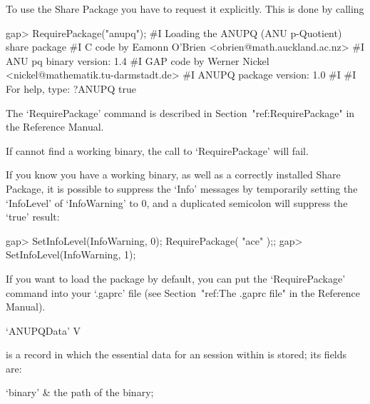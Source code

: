 


To use the {\ANUPQ} Share Package you have to request it explicitly. This
is done by calling

\beginexample
gap> RequirePackage("anupq");
#I    Loading the ANUPQ (ANU p-Quotient) share package
#I    C code by  Eamonn O'Brien <obrien@math.auckland.ac.nz>
#I                ANU pq binary version: 1.4
#I    GAP code by Werner Nickel <nickel@mathematik.tu-darmstadt.de>
#I                ANUPQ package version: 1.0
#I  
#I                For help, type: ?ANUPQ
true
\endexample

The `RequirePackage' command is described in Section~"ref:RequirePackage"
in the {\GAP} Reference Manual.

If {\GAP} cannot find a working binary, the call to `RequirePackage' will
fail.

If you know you have a working {\ANUPQ} binary, as well  as  a  correctly
installed {\ANUPQ} Share Package, it is possible to suppress  the  `Info'
messages by temporarily setting the `InfoLevel' of  `InfoWarning'  to  0,
and a duplicated semicolon will suppress the `true' result:

\beginexample
gap> SetInfoLevel(InfoWarning, 0); RequirePackage( "ace" );;
gap> SetInfoLevel(InfoWarning, 1);
\endexample

If you want to load the {\ANUPQ} package by  default,  you  can  put  the
`RequirePackage' command into your `.gaprc'  file  (see  Section~"ref:The
.gaprc file" in the {\GAP} Reference Manual).


\>`ANUPQData' V

is a {\GAP} record in which the essential data for  an  {\ANUPQ}  session
within {\GAP} is stored; its fields are:

\beginitems

\quad`binary' & the path of the {\ANUPQ} binary;

